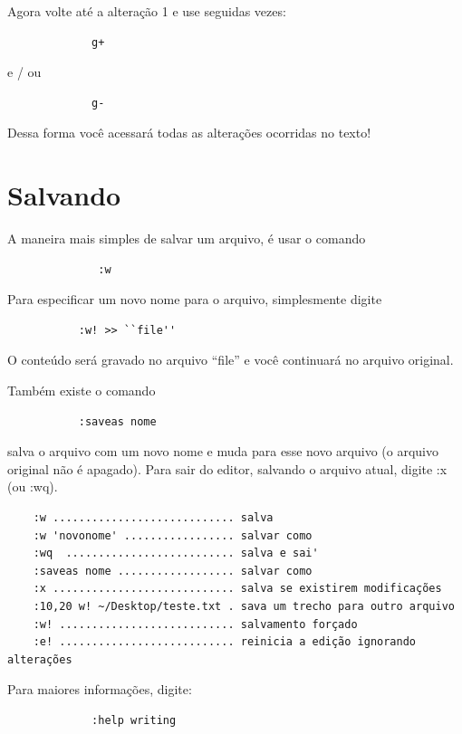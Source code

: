 \documentclass[10pt,a4paper,openany]{book}
\begin{document}
Agora volte até a alteração 1 e use seguidas vezes:

\begin{verbatim}
			 g+
\end{verbatim}

e / ou

\begin{verbatim}
			 g-
\end{verbatim}

Dessa forma você acessará todas as alterações ocorridas no texto!

\section{Salvando}

A maneira mais simples de salvar um arquivo, é usar o comando

\begin{verbatim}
			  :w
\end{verbatim}


Para especificar um novo nome para o arquivo, simplesmente digite

\begin{verbatim}
		   :w! >> ``file''
\end{verbatim}

O conteúdo será gravado no arquivo ``file'' e você continuará no arquivo original.

Também existe o comando

\begin{verbatim}
		   :saveas nome
\end{verbatim}

salva o arquivo com um novo nome e muda para esse novo arquivo (o arquivo original não é apagado).
Para sair do editor, salvando o arquivo atual, digite :x (ou :wq).

\begin{verbatim}
	:w ............................ salva
	:w 'novonome' ................. salvar como
	:wq  .......................... salva e sai'
	:saveas nome .................. salvar como
	:x ............................ salva se existirem modificações
	:10,20 w! ~/Desktop/teste.txt . sava um trecho para outro arquivo
	:w! ........................... salvamento forçado
	:e! ........................... reinicia a edição ignorando alterações
\end{verbatim}

Para maiores informações, digite:

\begin{verbatim}
			 :help writing
\end{verbatim}
\end{document}
